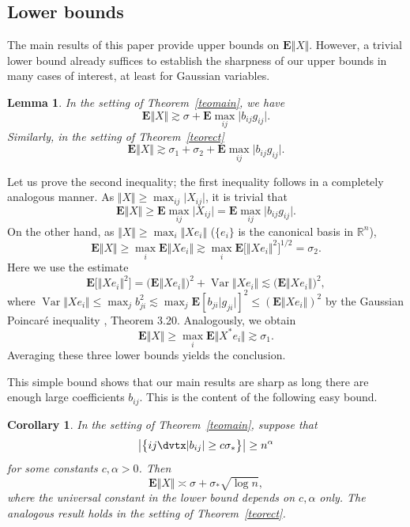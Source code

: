 \documentclass[aop,MSNbibl,dvips]{arximspdf}
\newcommand{\rrvert}{\vert}
\newcommand{\rrVert}{\Vert}
\newcommand{\llvert}{\vert}
\newcommand{\llVert}{\Vert}
\newtheorem{lem}[teo]{Lemma}
\newtheorem{cor}[teo]{Corollary}
\newcommand{\Var}{\operatorname{Var}}
\newcommand{\EE}{\mathbf{E}}
\begin{document}
\subsection{Lower bounds}\label{seclower}

The main results of this paper provide upper bounds on $\EE\llVert
X\rrVert $.
However, a trivial lower bound already suffices to establish the sharpness
of our upper bounds in many cases of interest, at least for Gaussian
variables.

%
\begin{lem}
\label{lemlower}
In the setting of Theorem~\ref{teomain}, we have
%
\[
\EE\llVert X\rrVert\gtrsim\sigma+ \EE\max_{ij}\llvert
b_{ij}g_{ij}\rrvert. %
\]
%
Similarly, in the setting of Theorem~\ref{teorect}
%
\[
\EE\llVert X\rrVert\gtrsim\sigma_1 + \sigma_2 + \EE
\max_{ij}\llvert b_{ij}g_{ij}\rrvert.
%
\]
%
\end{lem}

\begin{pf}
Let us prove the second inequality; the first inequality follows in a
completely analogous manner. As $\llVert X\rrVert \ge\max
_{ij}\llvert X_{ij}\rrvert $, it is
trivial that
%
\[
\EE\llVert X\rrVert\ge\EE\max_{ij}\llvert X_{ij}
\rrvert= \EE\max_{ij}\llvert b_{ij}g_{ij}
\rrvert. %
\]
%
On the other hand, as $\llVert X\rrVert \ge\max_i\llVert
Xe_i\rrVert $ ($\{e_i\}$ is the
canonical basis in $\mathbb{R}^n$),
%
\[
\EE\llVert X\rrVert\ge\max_i\EE\llVert Xe_i
\rrVert\gtrsim\max_i\EE\bigl[\llVert Xe_i
\rrVert^2\bigr]^{1/2} = \sigma_2. %
\]
%
Here we use the estimate
%
\[
\EE\bigl[\llVert Xe_i\rrVert^2\bigr] = \bigl(\EE\llVert
Xe_i\rrVert\bigr)^2 + \Var\llVert Xe_i
\rrVert\lesssim\bigl(\EE\llVert Xe_i\rrVert\bigr)^2,
%
\]
%
where $\Var\llVert Xe_i\rrVert \le\max_jb_{ji}^2\lesssim
\max_j\EE[b_{ji}\llvert g_{ji}\rrvert ]^2
\le
(\EE\llVert Xe_i\rrVert )^2$ by the Gaussian
Poincar\'e inequality \cite{BLM13}, Theorem 3.20.
Analogously, we obtain
%
\[
\EE\llVert X\rrVert\ge\max_i\EE\bigl\llVert
X^*e_i\bigr\rrVert\gtrsim\sigma_1. %
\]
%
Averaging these three lower bounds yields the conclusion.
\end{pf}

This simple bound shows that our main results are sharp as long there are
enough large coefficients $b_{ij}$. This is the content of the following
easy bound.

%
\begin{cor}
\label{corsimplelower}
In the setting of Theorem~\ref{teomain}, suppose that
%
\[
\bigl\llvert\bigl\{ij\dvtx\llvert b_{ij}\rrvert\ge c\sigma_*\bigr\}
\bigr
\rrvert\ge n^{\alpha} %
\]
%
for some constants $c,\alpha>0$. Then
%
\[
\EE\llVert X\rrVert\asymp\sigma+ \sigma_*\sqrt{\log n}, %
\]
%
where the universal constant in the lower bound depends on
$c,\alpha$ only. The analogous result holds in the setting of
Theorem~\ref{teorect}.
\end{cor}
\end{document}

